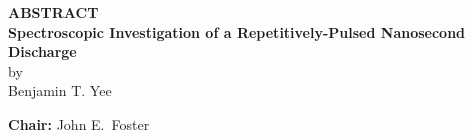 \documentclass[12pt]{article}
\begin{document}
\pagestyle{empty}
\begin{center}
  \textbf{\large ABSTRACT} \\
  \vspace{2em}
  \textbf{Spectroscopic Investigation of a Repetitively-Pulsed
    Nanosecond Discharge} \\
  \vspace{1em}
  by \\
  \vspace{1em}
  Benjamin T. Yee
\end{center}
\vspace{1em}
\textbf{Chair:} John E.\ Foster
\vspace{2em}

  
  
\end{document}
